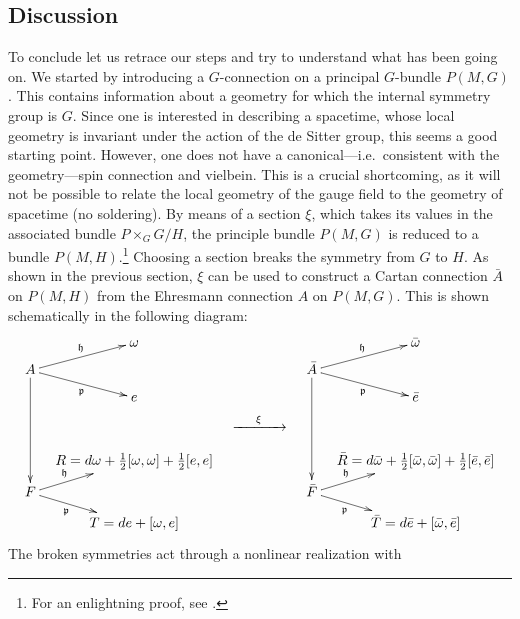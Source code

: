 \documentclass[11pt]{article}
\begin{document}
\subsection{Discussion}

To conclude let us retrace our steps and try to understand what 
has been going on. We started by introducing a $G$-connection on 
a principal $G$-bundle $P(M,G)$. This contains information about 
a geometry for which the internal symmetry group is $G$. Since 
one is interested in describing a spacetime, whose local geometry 
is invariant under the action of the de Sitter group, this seems 
a good starting point.  However, one does not have a 
canonical---i.e.~consistent with the geometry---spin connection 
and vielbein. This is a crucial shortcoming, as it will not be 
possible to relate the local geometry of the gauge field to the 
geometry of spacetime (no soldering).  By means of a section 
$\xi$, which takes its values in the associated bundle $P 
\times_G G/H$, the principle bundle $P(M,G)$ is reduced to a 
bundle $P(M,H)$.\footnote{For an enlightning proof, see 
	\cite{kob1996found}.} Choosing a section breaks the symmetry 
from $G$ to $H$. As shown in the previous section, $\xi$ can be 
used to construct a Cartan connection $\bar{A}$ on $P(M,H)$ from 
the Ehresmann connection $A$ on $P(M,G)$. This is shown 
schematically in the following diagram:
\begin{displaymath}
	\xymatrix@R=6pt@C=8pt{
			&	\omega & & & \bar{\omega}
		\\
		A
			\ar[ru]^-{\mathfrak{h}}
			\ar[rd]_-{\mathfrak{p}}
			\ar[dddd]
			& & & {\bar{A}}
							\ar[ru]^-{\mathfrak{h}}
							\ar[rd]_-{\mathfrak{p}}
							\ar[dddd]
		\\
			& e & & & \bar{e}
		\\
			& & {\xrightarrow{\hspace*{0.5cm}\xi\hspace*{0.5cm}}}
		\\
			& {R = d\omega + \tfrac{1}{2}[\omega,\omega] + 
				\tfrac{1}{2}[e,e]}
				& & & {\bar{R} = d\bar{\omega} +
							\tfrac{1}{2}[\bar{\omega},\bar{\omega}] +							
							\tfrac{1}{2}[\bar{e},\bar{e}]}
		\\
		F
			\ar[ru]^-{\mathfrak{h}}
			\ar[rd]_-{\mathfrak{p}}
			& & & \bar{F}
							\ar[ru]^-{\mathfrak{h}}
							\ar[rd]_-{\mathfrak{p}}
		\\
			& {T = de + [\omega,e]}
				& & & {\bar{T} = d\bar{e} + [\bar{\omega},\bar{e}]}
	}
\end{displaymath}
The broken symmetries act through a nonlinear realization with 
\end{document}
